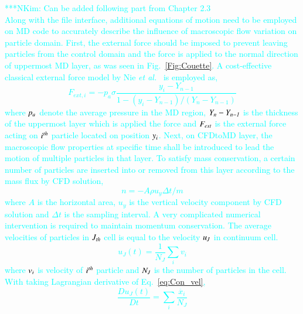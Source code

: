 \documentclass[preprint,12pt]{elsarticle}
\newcommand{\Nkimnote}[1]{ {\textcolor{cyan} { ***NKim: #1 }}}
\newcommand{\Nkimnote}[1]{}
\begin{document}
\Nkimnote{Can be added following part from Chapter 2.3\\
Along with the file interface, additional equations of motion need to be employed on MD code to accurately describe the influence of macroscopic flow variation on particle domain. First, the external force should be imposed to prevent leaving particles from the control domain and the force is applied to the normal direction of uppermost MD layer, as was seen in Fig.~\ref{Fig:Couette}. A cost-effective classical external force model by Nie {\it{et al.}}~\cite{Nie} is employed as,
\vspace{-.2em}
\begin{equation}
 F_{ext, i} = -p_{a}\sigma\frac{y_{i}-Y_{n-1}}{1-(y_{i}-Y_{n-1})/(Y_{n}-Y_{n-1})}
 \label{eq:External_Force}
\end{equation}
\normalsize
where $\it p_{a}$ denote the average pressure in the MD region, $\it Y_{n}-Y_{n-1}$ is the thickness of the uppermost layer which is applied the force and $\it F_{ext}$ is the external force acting on $\it i^{th}$ particle located on position $\it y_{i}$.
Next, on CFDtoMD layer, the macroscopic flow properties at specific time shall be introduced to lead the motion of multiple particles in that layer. To satisfy mass conservation, a certain number of particles are inserted into or removed from this layer according to the mass flux by CFD solution,
\vspace{-.2em}
\begin{equation}
n = -A \rho u_y \Delta t / m
 \label{eq:Mass_Flux}
\end{equation}
\normalsize
where $A$ is the horizontal area, $u_y$ is the vertical velocity component by CFD solution and $\Delta t$ is the sampling interval.
A very complicated numerical intervention is required to maintain momentum conservation. The average velocities of particles in $\it J_{th}$ cell is equal to the velocity $\it u_{J}$ in continuum cell.
\vspace{-.2em}
\begin{equation}
 u_{J}(t) = \frac{1}{N_{J}} \displaystyle\sum_{i} v_{i}
 \label{eq:Con_vel}
\end{equation}
\normalsize
where $\it v_{i}$ is velocity of $\it i^{th}$ particle and $\it N_{J}$ is the number of particles in the cell. With taking Lagrangian derivative of Eq.~\ref{eq:Con_vel},
\vspace{-.2em}
\begin{equation}
 \frac{Du_{J}(t)}{Dt} =  \displaystyle\sum_{i} \frac{\ddot{x_{i}}}{N_{J}}

\end{equation}}
\end{document}
